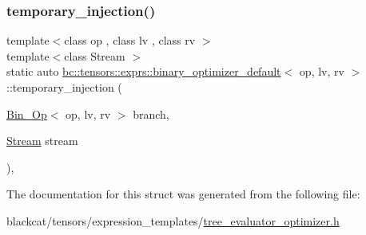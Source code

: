 \mbox{\label{structbc_1_1tensors_1_1exprs_1_1binary__optimizer__default_a3ed135706adb417fe480b8618c96dbee}} 
\subsubsection{\texorpdfstring{temporary\+\_\+injection()}{temporary\_injection()}}
{\footnotesize\ttfamily template$<$class op , class lv , class rv $>$ \\
template$<$class Stream $>$ \\
static auto \hyperlink{structbc_1_1tensors_1_1exprs_1_1binary__optimizer__default}{bc\+::tensors\+::exprs\+::binary\+\_\+optimizer\+\_\+default}$<$ op, lv, rv $>$\+::temporary\+\_\+injection (\begin{DoxyParamCaption}\item[{\hyperlink{structbc_1_1tensors_1_1exprs_1_1Bin__Op}{Bin\+\_\+\+Op}$<$ op, lv, rv $>$}]{branch,  }\item[{\hyperlink{classbc_1_1streams_1_1Stream}{Stream}}]{stream }\end{DoxyParamCaption})\hspace{0.3cm}{\ttfamily [inline]}, {\ttfamily [static]}}



The documentation for this struct was generated from the following file\+:\begin{DoxyCompactItemize}
\item 
blackcat/tensors/expression\+\_\+templates/\hyperlink{tree__evaluator__optimizer_8h}{tree\+\_\+evaluator\+\_\+optimizer.\+h}\end{DoxyCompactItemize}
